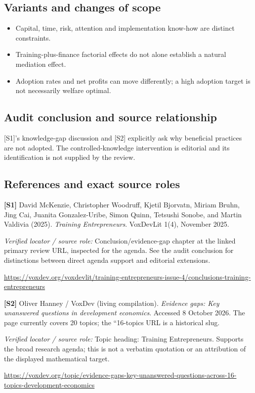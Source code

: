\documentclass[11pt,a4paper]{article}
\begin{document}
\subsection*{Variants and changes of scope}

\begin{itemize}
\item Capital, time, risk, attention and implementation know-how are distinct constraints.
\item Training-plus-finance factorial effects do not alone establish a natural mediation effect.
\item Adoption rates and net profits can move differently; a high adoption target is not necessarily welfare optimal.
\end{itemize}

\subsection*{Audit conclusion and source relationship}

[S1]'s knowledge-gap discussion and [S2] explicitly ask why beneficial practices are not adopted. The controlled-knowledge intervention is editorial and its identification is not supplied by the review.

\subsection*{References and exact source roles}

{\footnotesize\raggedright
\par\noindent\textbf{[S1]} David McKenzie, Christopher Woodruff, Kjetil Bjorvatn, Miriam Bruhn, Jing Cai, Juanita Gonzalez-Uribe, Simon Quinn, Tetsushi Sonobe, and Martin Valdivia (2025). \emph{Training Entrepreneurs}. VoxDevLit 1(4), November 2025.\par \textit{Verified locator / source role:} Conclusion/evidence-gap chapter at the linked primary review URL, inspected for the agenda. See the audit conclusion for distinctions between direct agenda support and editorial extensions.\par \url{https://voxdev.org/voxdevlit/training-entrepreneurs-issue-4/conclusions-training-entrepreneurs}\par\smallskip
\par\noindent\textbf{[S2]} Oliver Hanney / VoxDev (living compilation). \emph{Evidence gaps: Key unanswered questions in development economics}. Accessed 8 October 2026. The page currently covers 20 topics; the ``16-topics URL is a historical slug.\par \textit{Verified locator / source role:} Topic heading: Training Entrepreneurs. Supports the broad research agenda; this is not a verbatim quotation or an attribution of the displayed mathematical target.\par \url{https://voxdev.org/topic/evidence-gaps-key-unanswered-questions-across-16-topics-development-economics}\par\smallskip
}
\end{document}
